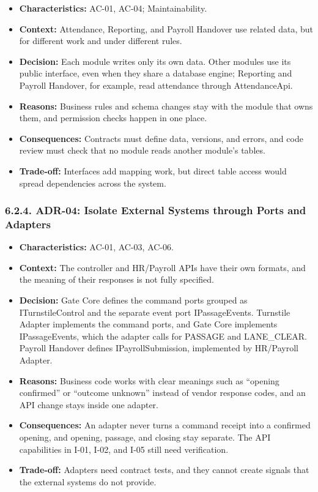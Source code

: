 \begin{itemize}[leftmargin=36pt, itemsep=2pt, topsep=4pt, parsep=2pt]
  \item \textbf{Characteristics:} AC-01, AC-04; Maintainability.
  \item \textbf{Context:} Attendance, Reporting, and Payroll Handover use related data, but for different work and under different rules.
  \item \textbf{Decision:} Each module writes only its own data. Other modules use its public interface, even when they share a database engine; Reporting and Payroll Handover, for example, read attendance through AttendanceApi.
  \item \textbf{Reasons:} Business rules and schema changes stay with the module that owns them, and permission checks happen in one place.
  \item \textbf{Consequences:} Contracts must define data, versions, and errors, and code review must check that no module reads another module's tables.
  \item \textbf{Trade-off:} Interfaces add mapping work, but direct table access would spread dependencies across the system.
\end{itemize}

\subsubsection*{6.2.4. ADR-04: Isolate External Systems through Ports and Adapters}

{}

\begin{itemize}[leftmargin=36pt, itemsep=2pt, topsep=4pt, parsep=2pt]
  \item \textbf{Characteristics:} AC-01, AC-03, AC-06.
  \item \textbf{Context:} The controller and HR/Payroll APIs have their own formats, and the meaning of their responses is not fully specified.
  \item \textbf{Decision:} Gate Core defines the command ports grouped as ITurnstileControl and the separate event port IPassageEvents. Turnstile Adapter implements the command ports, and Gate Core implements IPassageEvents, which the adapter calls for PASSAGE and LANE\_CLEAR. Payroll Handover defines IPayrollSubmission, implemented by HR/Payroll Adapter.
  \item \textbf{Reasons:} Business code works with clear meanings such as ``opening confirmed'' or ``outcome unknown'' instead of vendor response codes, and an API change stays inside one adapter.
  \item \textbf{Consequences:} An adapter never turns a command receipt into a confirmed opening, and opening, passage, and closing stay separate. The API capabilities in I-01, I-02, and I-05 still need verification.
  \item \textbf{Trade-off:} Adapters need contract tests, and they cannot create signals that the external systems do not provide.
\end{itemize}

